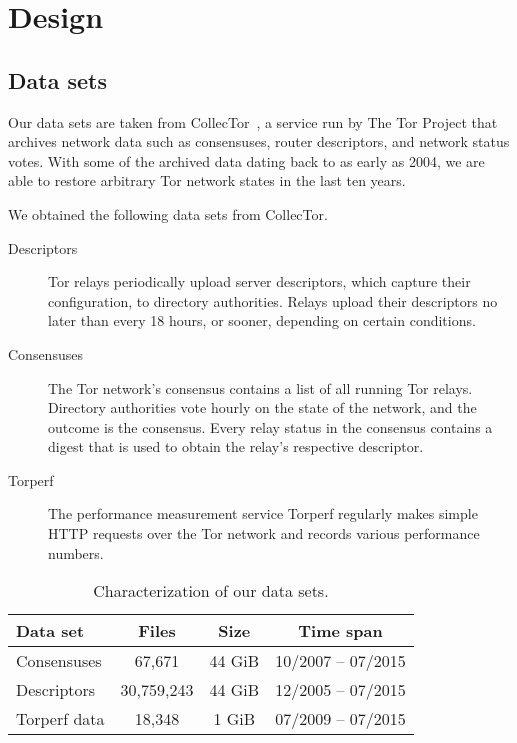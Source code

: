 \section{Design}
\label{sec:design}

\subsection{Data sets}
Our data sets are taken from CollecTor~\cite{collector}, a service run by The
Tor Project that archives network data such as consensuses, router descriptors,
and network status votes.  With some of the archived data dating back to as
early as 2004, we are able to restore arbitrary Tor network states in the last
ten years.

We obtained the following data sets from CollecTor.
\begin{description}
	\item[Descriptors] Tor relays periodically upload server descriptors, which
		capture their configuration, to directory authorities.  Relays upload
		their descriptors no later than every 18 hours, or sooner, depending on
		certain conditions.

	\item[Consensuses] The Tor network's consensus contains a list of all
		running Tor relays.  Directory authorities vote hourly on the state of
		the network, and the outcome is the consensus.  Every relay status in
		the consensus contains a digest that is used to obtain the relay's
		respective descriptor.

	\item[Torperf] The performance measurement service Torperf regularly makes
		simple HTTP requests over the Tor network and records various
		performance numbers.
\end{description}

\begin{table}[t]
\centering
\begin{tabular}{l c c c}
\textbf{Data set} & \textbf{Files} & \textbf{Size} & \textbf{Time span} \\
\hline
Consensuses & 67,671 & 44 GiB & 10/2007 -- 07/2015 \\
Descriptors & 30,759,243 & 44 GiB & 12/2005 -- 07/2015 \\
Torperf data & 18,348 & 1 GiB & 07/2009 -- 07/2015 \\
\end{tabular}
\caption{Characterization of our data sets.}
\label{tab:datasets}
\end{table}

